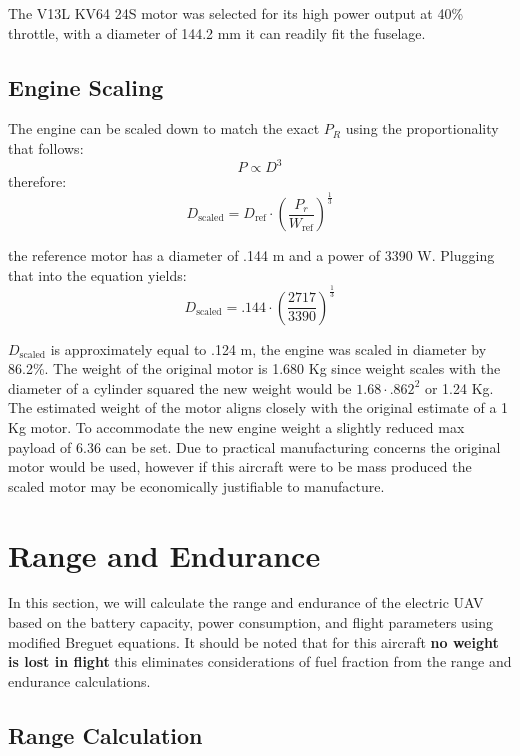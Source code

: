 \documentclass[12pt]{article}
\begin{document}
	The V13L KV64 24S motor was selected for its high power output at 40\% throttle, with a diameter of 144.2 mm it can readily fit the fuselage. 
	
	\subsection{Engine Scaling}
	The engine can be scaled down to match the exact $P_R$ using the proportionality that follows:
	\begin{equation}
		P \propto D^3
	\end{equation}
	therefore:
	\begin{equation}
		D_{\text{scaled}} = D_{\text{ref}} \cdot \left( \frac{P_r}{W_{\text{ref}}} \right)^{\frac{1}{3}}
	\end{equation}
	
	the reference motor has a diameter of .144 m and a power of 3390 W. Plugging that into the equation yields:
	\begin{equation}
		D_{\text{scaled}} = .144 \cdot \left( \frac{2717}{3390} \right)^{\frac{1}{3}}
	\end{equation}
	
	$D_{\text{scaled}}$ is approximately equal to .124 m, the engine was scaled in diameter by 86.2\%. The weight of the original motor is 1.680 Kg since weight scales with the diameter of a cylinder squared the new weight would be $1.68 \cdot .862^2$ or 1.24 Kg. The estimated weight of the motor aligns closely with the original estimate of a 1 Kg motor. To accommodate the new engine weight a slightly reduced max payload of 6.36 can be set.  Due to practical manufacturing concerns the original motor would be used, however if this aircraft were to be mass produced the scaled motor may be economically justifiable to manufacture.
	
	\section{Range and Endurance}
	
	In this section, we will calculate the range and endurance of the electric UAV based on the battery capacity, power consumption, and flight parameters using modified Breguet equations. It should be noted that for this aircraft \textbf{no weight is lost in flight} this eliminates considerations of fuel fraction from the range and endurance calculations.
	
	\subsection{Range Calculation}
	
\end{document}
